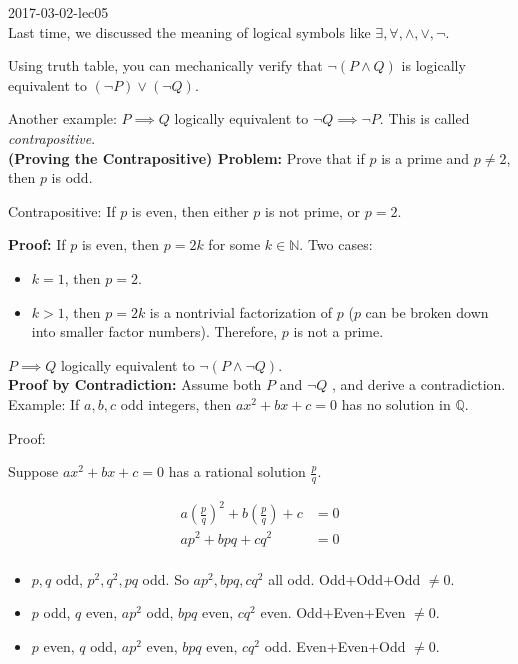 \documentclass[a4paper, 11pt, twoside]{article}
\begin{document}
2017-03-02-lec05\\

Last time, we discussed the meaning of logical symbols like $\exists, \forall, \wedge, \vee, \neg$.

Using truth table, you can mechanically verify that $\neg (P \wedge Q)$ is logically equivalent to $(\neg P) \vee (\neg Q).$

Another example: $P \implies Q$ logically equivalent to $\neg Q \implies \neg P.$ This is called \textit{contrapositive}.\\

\textbf{(Proving the Contrapositive) Problem:} Prove that if $p$ is a prime and $p\not=2$, then $p$ is odd.

Contrapositive: If $p$ is even, then either $p$ is not prime, or $p=2$.

\textbf{Proof:} If $p$ is even, then $p=2k$ for some $k\in \mathbb{N}.$ Two cases:

\begin{itemize}
	\item $k=1$, then $p=2$.
	\item $k>1$, then $p=2k$ is a nontrivial factorization of $p$ ($p$ can be broken down into smaller factor numbers). Therefore, $p$ is not a prime.
\end{itemize}

$P\implies Q$ logically equivalent to $\neg(P\wedge\neg Q).$\\

\textbf{Proof by Contradiction:} Assume both $P$ and $\neg Q$ , and derive a contradiction.\\

Example: If $a, b, c$ odd integers, then $ax^2+bx+c=0$ has no solution in $\mathbb{Q}.$

Proof:

Suppose $ax^2+bx+c=0$ has a rational solution $\frac{p}{q}.$

\[
\begin{split}
	a\left(\frac{p}{q}\right)^2+b\left(\frac{p}{q}\right)+c&=0\\
	ap^2+bpq+cq^2&=0\\	
\end{split}
\]

\begin{itemize}
	\item $p, q$ odd, $p^2, q^2, pq$ odd. So $ap^2, bpq, cq^2$ all odd. Odd+Odd+Odd $\not=0$.
	\item $p$ odd, $q$ even, $ap^2$ odd, $bpq$ even, $cq^2$ even. Odd+Even+Even $\not=0$.
	\item $p$ even, $q$ odd, $ap^2$ even, $bpq$ even, $cq^2$ odd. Even+Even+Odd $\not=0$.
\end{itemize}
\end{document}
